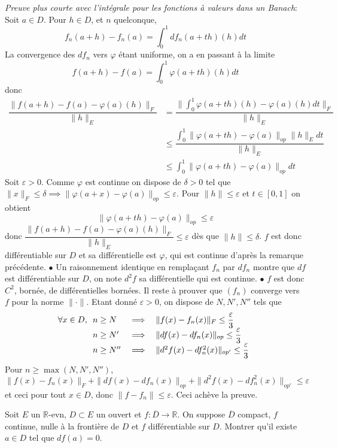 \documentclass{fancybook}
\begin{document}
\textit{Preuve plus courte avec l'intégrale pour les fonctions à valeurs dans un Banach}:
Soit $a\in D$. Pour $h\in D$, et $n$ quelconque, $$f_n(a+h)-f_n(a)=\int_0^1 df_n(a+th)(h)dt$$
La convergence des $df_n$ vers $\varphi$ étant uniforme, on a en passant à la limite $$f(a+h)-f(a) = \int_0^1 \varphi(a+th)(h) dt$$
donc $$\begin{aligned} \dfrac{\|f(a+h)-f(a)-\varphi(a)(h)\|_F}{\|h\|_E}&=\dfrac{\|\int_0^1 \varphi(a+th)(h)-  \varphi(a)(h) dt\|_F}{\|h\|_E} \\
&\leq \dfrac{\int_0^1 \|\varphi(a+th)-\varphi(a)\|_{op}\|h\|_E dt}{\|h\|_E}\\
&\leq \int_0^1 \|\varphi(a+th)-\varphi(a)\|_{op} dt \end{aligned}$$
Soit $\varepsilon>0$. Comme $\varphi$ est continue on dispose de $\delta >0$ tel que $\|x\|_F \leq \delta \implies \|\varphi(a+x)-\varphi(a)\|_{op} \leq \varepsilon$. Pour $\|h\| \leq \varepsilon$ et $t\in [0,1]$ on obtient $$\|\varphi(a+th)-\varphi(a)\|_{op}\leq \varepsilon$$ donc $\displaystyle \dfrac{\|f(a+h)-f(a)-\varphi(a)(h)\|_F}{\|h\|_E}\leq \varepsilon$ dès que $\|h\| \leq \delta$.\newline
$f$ est donc différentiable sur $D$ et sa différentielle est $\varphi$, qui est continue d'après la remarque précédente.\newline
$\bullet$ Un raisonnement identique en remplaçant $f_n$ par $df_n$ montre que $df$ est différentiable sur $D$, on note $d^2f$ sa différentielle qui est continue.\newline
$\bullet$ $f$ est donc $C^2$, bornée, de différentielles bornées. Il reste à prouver que $(f_n)$ converge vers $f$ pour la norme $\|\cdot\|$.\newline
Etant donné $\varepsilon >0$, on dispose de $N,N',N''$ tels que $$ 
\forall x\in D, \begin{array}[t]{lcl} n\geq N &\implies &\|f(x) -f_n(x)\|_F \leq \dfrac{\varepsilon}3 \\
n\geq N' &\implies &\|df(x) -df_n(x)\|_{op} \leq \dfrac{\varepsilon}3 \\
n\geq N'' &\implies &\|d^2f(x) -df^2_n(x)\|_{op'} \leq \dfrac{\varepsilon}3
\end{array}$$
Pour $n\geq \max(N,N',N'')$, $$\|f(x) -f_n(x)\|_F+\|df(x) -df_n(x)\|_{op}+\|d^2f(x) -df^2_n(x)\|_{op'}\leq \varepsilon$$ et ceci pour tout $x\in D$, donc $\|f-f_n\|\leq \varepsilon$. Ceci achève la preuve.

\begin{exercice}
Soit $E$ un $\mathbb R$-evn, $D\subset E$ un ouvert et $f:\overline{D}\to \mathbb R$. On suppose $\overline{D}$ compact, $f$ continue, nulle à la frontière de $D$ et $f$ différentiable sur $D$.\newline
Montrer qu'il existe $a\in D$ tel que $df(a)=0$.
\end{exercice}
\end{document}
